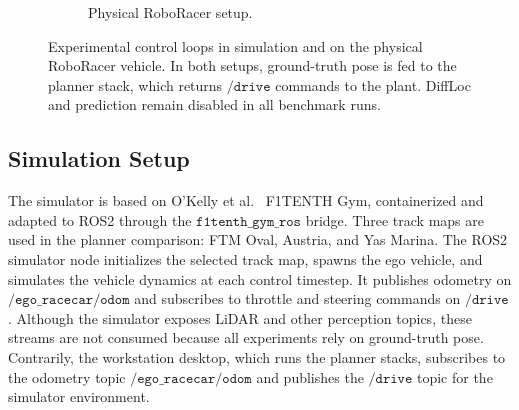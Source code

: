 \begin{figure}[htbp]
\begin{subfigure}{\textwidth}
        \caption{Physical RoboRacer setup.}
        \label{fig:exp_setup_real}
    \end{subfigure}
    \caption{Experimental control loops in simulation and on the physical RoboRacer vehicle.
    In both setups, ground-truth pose is fed to the planner stack, which returns $\texttt{/drive}$ commands to the plant.
    DiffLoc and prediction remain disabled in all benchmark runs.}
    \label{fig:exp_setup}
\end{figure}

\subsection{Simulation Setup}

The simulator is based on O'Kelly et al.\ \cite{okelly_F1TENTHOpensourceEvaluation_2019} F1TENTH Gym, containerized and adapted to ROS2 through the $\texttt{f1tenth\_gym\_ros}$ bridge.
Three track maps are used in the planner comparison: FTM Oval, Austria, and Yas Marina.
The ROS2 simulator node initializes the selected track map, spawns the ego vehicle, and simulates the vehicle dynamics at each control timestep.
It publishes odometry on $\texttt{/ego\_racecar/odom}$ and subscribes to throttle and steering commands on $\texttt{/drive}$.
Although the simulator exposes LiDAR and other perception topics, these streams are not consumed because all experiments rely on ground-truth pose.
Contrarily, the workstation desktop, which runs the planner stacks, subscribes to the odometry topic $\texttt{/ego\_racecar/odom}$ and publishes the $\texttt{/drive}$ topic for the simulator environment.

